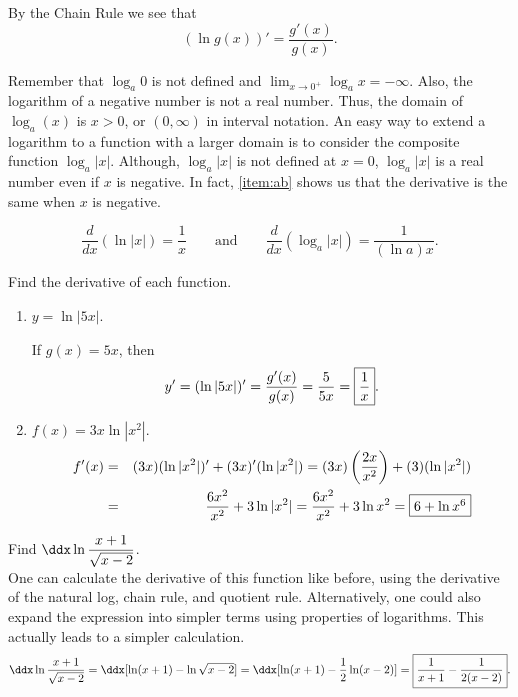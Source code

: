 \documentclass{book}
\begin{document}
By the Chain Rule we see that \[(\ln g(x))' = \dfrac{g'(x)}{g(x)}.\]
 
Remember that $\log_a 0$ is not defined and $\displaystyle\lim_{x\to 0^+} \log_a x = -\infty$. Also, the logarithm of a negative number is not a real number\footnotemark. Thus, the domain of $\log_a (x)$ is $x>0$, or $(0,\infty)$ in interval notation. An easy way to extend a logarithm to a function with a larger domain is to consider the composite function $\log_a |x|$. Although, $\log_a |x|$ is not defined at $x=0$, $\log_a |x|$ is a real number even if $x$ is negative. In fact,  \ref{item:ab} shows us that the derivative is the same when $x$ is negative. \\

\begin{Thm} \[\dfrac{d}{dx}(\ln|x|) = \dfrac{1}{x}\qquad \text{and} \qquad \dfrac{d}{dx}(\log_a |x|) = \dfrac{1}{(\ln a) x}.\]\end{Thm}\vs

\begin{Exam} Find the derivative of each function.
\begin{enumerate}
\item $y = \ln|5x|$.\vs

If $g(x) = 5x$, then 
\[y' = (\ln|5x|)' = \dfrac{g'(x)}{g(x)} = \dfrac{5}{5x} = \fbox{$\dfrac{1}{x}$}.\]

\item $f(x) = 3x \ln |x^2|$.
\begin{eqnarray*}
f'(x) &=& (3x)(\ln |x^2|)' + (3x)'(\ln |x^2|) = (3x)\left(\dfrac{2x}{x^2}\right) + (3)(\ln |x^2|)\\
&=& \dfrac{6x^2}{x^2} + 3\ln |x^2| = \dfrac{6x^2}{x^2} + 3\ln x^2 = \fbox{$6 + \ln x^6$}
\end{eqnarray*}
\end{enumerate}
\end{Exam}\vs

\begin{Exam} Find $\ddx \ln \dfrac{x+1}{\sqrt{x-2}}$.\\

One can calculate the derivative of this function like before, using the derivative of the natural log, chain rule, and quotient rule. Alternatively, one could also expand the expression into simpler terms using properties of logarithms. This actually leads to a simpler calculation. 
\[\ddx \ln \dfrac{x+1}{\sqrt{x-2}} = \ddx[ \ln (x+1) - \ln \sqrt{x-2}] = \ddx[\ln (x+1) - \frac{1}{2}\ln (x-2)]\\
= \fbox{$\dfrac{1}{x+1} - \dfrac{1}{2(x-2)}$}. \]
\end{Exam}\vs
\end{document}
